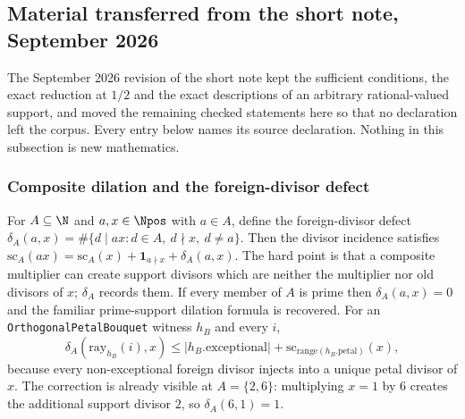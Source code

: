 \subsection{Material transferred from the short note, September 2026}
\label{sec:257-transferred}

The September 2026 revision of the short note kept the sufficient conditions,
the exact reduction at $1/2$ and the exact descriptions of an arbitrary
rational-valued support, and moved the remaining checked statements here so
that no declaration left the corpus.  Every entry below names its source
declaration.  Nothing in this subsection is new mathematics.

\subsubsection*{Composite dilation and the foreign-divisor defect}

\begin{thm}
For $A\subseteq\N$ and $a,x\in\Npos$ with $a\in A$, define the foreign-divisor
defect $\delta_A(a,x)=\#\{d\mid ax: d\in A,\ d\nmid x,\ d\ne a\}$.  Then the
divisor incidence satisfies
$\mathrm{sc}_A(ax)=\mathrm{sc}_A(x)+\mathbf 1_{a\nmid x}+\delta_A(a,x)$.
The hard point is that a composite multiplier can create support divisors
which are neither the multiplier nor old divisors of $x$; $\delta_A$ records
them.  If every member of $A$ is prime then $\delta_A(a,x)=0$ and the familiar
prime-support dilation formula is recovered.  For an
\texttt{OrthogonalPetalBouquet} witness $h_B$ and every $i$,
\[
\delta_A(\mathrm{ray}_{h_B}(i),x)\le
|h_B.\mathrm{exceptional}|+\mathrm{sc}_{\mathrm{range}(h_B.\mathrm{petal})}(x),
\]
because every non-exceptional foreign divisor injects into a unique petal
divisor of $x$.  The correction is already visible at $A=\{2,6\}$: multiplying
$x=1$ by $6$ creates the additional support divisor $2$, so
$\delta_A(6,1)=1$.
\par\noindent{}  
\end{thm}

